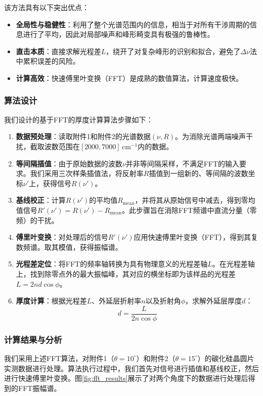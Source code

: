 \documentclass[withoutpreface,bwprint]{cumcmthesis} %
\begin{document}
该方法具有以下突出优点：
\begin{itemize}
    \item \textbf{全局性与稳健性}：利用了整个光谱范围内的信息，相当于对所有干涉周期的信息进行了平均，因此对局部噪声和峰形畸变具有极强的鲁棒性。
    \item \textbf{直击本质}：直接求解光程差$L$，绕开了对复杂峰形的识别和拟合，避免了$\Delta\nu$法中累积误差的风险。
    \item \textbf{计算高效}：快速傅里叶变换（FFT）是成熟的数值算法，计算速度极快。
\end{itemize}

\subsubsection{算法设计}
我们设计的基于FFT的厚度计算算法步骤如下：
\begin{enumerate}
    \item \textbf{数据预处理}：读取附件1和附件2的光谱数据$(\nu, R)$。为消除光谱两端噪声干扰，截取波数范围在$[2000, 7000]\, \text{cm}^{-1}$内的数据。
    \item \textbf{等间隔插值}：由于原始数据的波数$\nu$并非等间隔采样，不满足FFT的输入要求。我们采用三次样条插值法，将反射率$R$插值到一组新的、等间隔的波数坐标$\nu'$上，获得信号$R(\nu')$。
    \item \textbf{基线校正}：计算$R(\nu')$的平均值$R_{\text{mean}}$，并将其从原始信号中减去，得到零均值信号$R'(\nu') = R(\nu') - R_{\text{mean}}$。此步骤旨在消除FFT频谱中直流分量（零频）的干扰。
    \item \textbf{傅里叶变换}：对处理后的信号$R'(\nu')$应用快速傅里叶变换（FFT），得到其复数频谱。取其模值，获得振幅谱。
    \item \textbf{光程差定位}：将FFT的频率轴转换为具有物理意义的光程差轴$L$。在光程差轴上，找到除零点外的最大振幅峰，其对应的横坐标即为该样品的光程差$L = 2nd\cos\phi$。
    \item \textbf{厚度计算}：根据光程差$L$、外延层折射率$n$以及折射角$\phi$，求解外延层厚度$d$：
          $$ d = \frac{L}{2n\cos\phi} $$
\end{enumerate}

\subsubsection{计算结果与分析}

我们采用上述FFT算法，对附件1（$\theta=10^\circ$）和附件2（$\theta=15^\circ$）的碳化硅晶圆片实测数据进行处理。算法执行过程中，我们首先对信号进行插值和基线校正，然后进行快速傅里叶变换。图\ref{fig:fft_results}展示了对两个角度下的数据进行处理后得到的FFT振幅谱。
\end{document}
